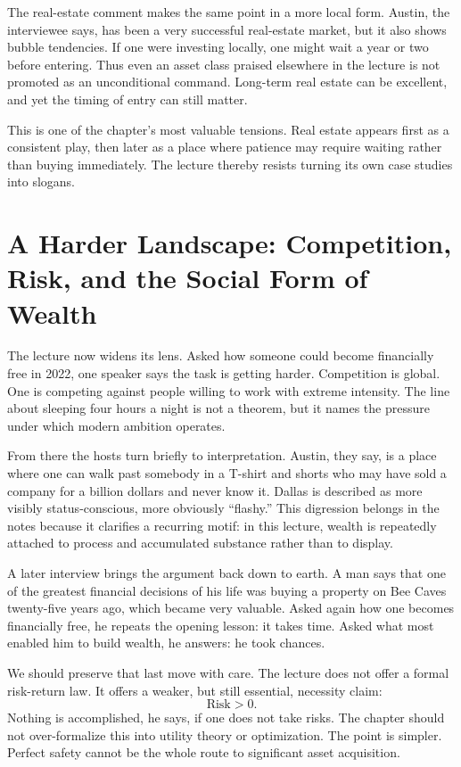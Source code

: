The real-estate comment makes the same point in a more local form. Austin, the interviewee says, has been a very successful real-estate market, but it also shows bubble tendencies. If one were investing locally, one might wait a year or two before entering. Thus even an asset class praised elsewhere in the lecture is not promoted as an unconditional command. Long-term real estate can be excellent, and yet the timing of entry can still matter.

This is one of the chapter's most valuable tensions. Real estate appears first as a consistent play, then later as a place where patience may require waiting rather than buying immediately. The lecture thereby resists turning its own case studies into slogans.

\section{A Harder Landscape: Competition, Risk, and the Social Form of Wealth}

The lecture now widens its lens. Asked how someone could become financially free in 2022, one speaker says the task is getting harder. Competition is global. One is competing against people willing to work with extreme intensity. The line about sleeping four hours a night is not a theorem, but it names the pressure under which modern ambition operates.

From there the hosts turn briefly to interpretation. Austin, they say, is a place where one can walk past somebody in a T-shirt and shorts who may have sold a company for a billion dollars and never know it. Dallas is described as more visibly status-conscious, more obviously ``flashy.'' This digression belongs in the notes because it clarifies a recurring motif: in this lecture, wealth is repeatedly attached to process and accumulated substance rather than to display.

A later interview brings the argument back down to earth. A man says that one of the greatest financial decisions of his life was buying a property on Bee Caves twenty-five years ago, which became very valuable. Asked again how one becomes financially free, he repeats the opening lesson: it takes time. Asked what most enabled him to build wealth, he answers: he took chances.

We should preserve that last move with care. The lecture does not offer a formal risk-return law. It offers a weaker, but still essential, necessity claim:
\begin{equation}
\text{Risk} > 0.
\end{equation}
Nothing is accomplished, he says, if one does not take risks. The chapter should not over-formalize this into utility theory or optimization. The point is simpler. Perfect safety cannot be the whole route to significant asset acquisition.

